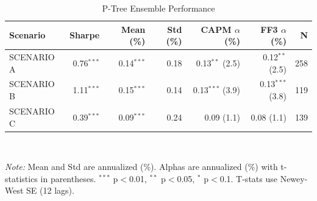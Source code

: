 \begin{table}[!ht]
\centering
\caption{P-Tree Ensemble Performance}
\label{tab:performance}
\small
\begin{tabular}{l r r r r r r}
\hline
Scenario & Sharpe & Mean (\%) & Std (\%) & CAPM $\alpha$ (\%) & FF3 $\alpha$ (\%) & N \\
\hline
SCENARIO A & 0.76$^{***}$ & 0.14$^{***}$ & 0.18 & 0.13$^{**}$ (2.5) & 0.12$^{**}$ (2.5) & 258 \\
SCENARIO B & 1.11$^{***}$ & 0.15$^{***}$ & 0.14 & 0.13$^{***}$ (3.9) & 0.13$^{***}$ (3.8) & 119 \\
SCENARIO C & 0.39$^{***}$ & 0.09$^{***}$ & 0.24 & 0.09 (1.1) & 0.08 (1.1) & 139 \\
\hline
\end{tabular}
\\[0.5em]
\begin{minipage}{0.95\textwidth}
\footnotesize
\textit{Note:} Mean and Std are annualized (\%). Alphas are annualized (\%) with t-statistics in parentheses. $^{***}$ p$<$0.01, $^{**}$ p$<$0.05, $^{*}$ p$<$0.1. T-stats use Newey-West SE (12 lags).
\end{minipage}
\end{table}
